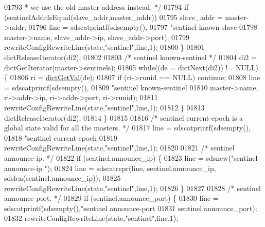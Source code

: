 \begin{DoxyCode}
{{{{{{{{{{{{{{{{{{{{{{{{{{{{01793 \textcolor{comment}{             * we use the old master address instead. */}
01794             \textcolor{keywordflow}{if} (sentinelAddrIsEqual(slave\_addr,master\_addr))
01795                 slave\_addr = master->addr;
01796             line = sdscatprintf(sdsempty(),
01797                 \textcolor{stringliteral}{"sentinel known-slave %
01798                 master->name, slave\_addr->ip, slave\_addr->port);
01799             rewriteConfigRewriteLine(state,\textcolor{stringliteral}{"sentinel"},line,1);
01800         \}
01801         dictReleaseIterator(di2);
01802 
01803         \textcolor{comment}{/* sentinel known-sentinel */}
01804         di2 = dictGetIterator(master->sentinels);
01805         \textcolor{keywordflow}{while}((de = dictNext(di2)) != NULL) \{
01806             ri = \hyperlink{dict_8h_ae8d2cc391873b2bea2b87c4f80f43120}{dictGetVal}(de);
01807             \textcolor{keywordflow}{if} (ri->runid == NULL) \textcolor{keywordflow}{continue};
01808             line = sdscatprintf(sdsempty(),
01809                 \textcolor{stringliteral}{"sentinel known-sentinel %
01810                 master->name, ri->addr->ip, ri->addr->port, ri->runid);
01811             rewriteConfigRewriteLine(state,\textcolor{stringliteral}{"sentinel"},line,1);
01812         \}
01813         dictReleaseIterator(di2);
01814     \}
01815 
01816     \textcolor{comment}{/* sentinel current-epoch is a global state valid for all the masters. */}
01817     line = sdscatprintf(sdsempty(),
01818         \textcolor{stringliteral}{"sentinel current-epoch %
01819     rewriteConfigRewriteLine(state,\textcolor{stringliteral}{"sentinel"},line,1);
01820 
01821     \textcolor{comment}{/* sentinel announce-ip. */}
01822     \textcolor{keywordflow}{if} (sentinel.announce\_ip) \{
01823         line = sdsnew(\textcolor{stringliteral}{"sentinel announce-ip "});
01824         line = sdscatrepr(line, sentinel.announce\_ip, sdslen(sentinel.announce\_ip));
01825         rewriteConfigRewriteLine(state,\textcolor{stringliteral}{"sentinel"},line,1);
01826     \}
01827 
01828     \textcolor{comment}{/* sentinel announce-port. */}
01829     \textcolor{keywordflow}{if} (sentinel.announce\_port) \{
01830         line = sdscatprintf(sdsempty(),\textcolor{stringliteral}{"sentinel announce-port %
01831                             sentinel.announce\_port);
01832         rewriteConfigRewriteLine(state,\textcolor{stringliteral}{"sentinel"},line,1);
}}}}}}}}}}}}}}}}}}}}}}}}}}}}}}}}
\end{DoxyCode}
